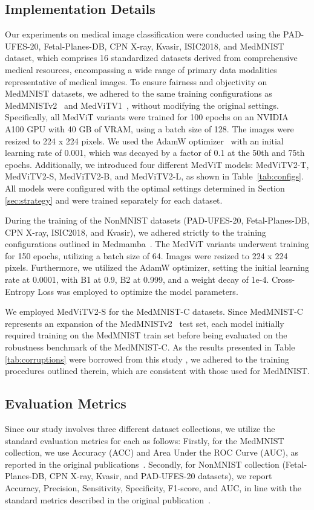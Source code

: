 \documentclass[times,twocolumn,final]{elsarticle}
\begin{document}
\subsection{Implementation Details}
\label{sec:2.5}
Our experiments on medical image classification were conducted using the PAD-UFES-20, Fetal-Planes-DB, CPN X-ray, Kvasir, ISIC2018, and MedMNIST dataset, which comprises 16 standardized datasets derived from comprehensive medical resources, encompassing a wide range of primary data modalities representative of medical images. To ensure fairness and objectivity on MedMNIST datasets, we adhered to the same training configurations as MedMNISTv2~\cite{yang2023medmnist} and MedViTV1~\cite{manzari2023medvit}, without modifying the original settings. Specifically, all MedViT variants were trained for 100 epochs on an NVIDIA A100 GPU with 40 GB of VRAM, using a batch size of 128. The images were resized to 224 x 224 pixels. We used the AdamW optimizer~\cite{AdamW} with an initial learning rate of 0.001, which was decayed by a factor of 0.1 at the 50th and 75th epochs. Additionally, we introduced four different MedViT models: MedViTV2-T, MedViTV2-S, MedViTV2-B, and MedViTV2-L, as shown in Table~\ref{tab:configs}. All models were configured with the optimal settings determined in Section \ref{sec:strategy} and were trained separately for each dataset.

During the training of the NonMNIST datasets (PAD-UFES-20, Fetal-Planes-DB, CPN X-ray, ISIC2018, and Kvasir), we adhered strictly to the training configurations outlined in Medmamba~\cite{yue2024medmamba}. The MedViT variants underwent training for 150 epochs, utilizing a batch size of 64. Images were resized to 224 x 224 pixels. Furthermore, we utilized the AdamW optimizer, setting the initial learning rate at 0.0001, with B1 at 0.9, B2 at 0.999, and a weight decay of 1e-4. Cross-Entropy Loss was employed to optimize the model parameters.

We employed MedViTV2-S for the MedMNIST-C datasets. Since MedMNIST-C represents an expansion of the MedMNISTv2~\cite{yang2023medmnist} test set, each model initially required training on the MedMNIST train set before being evaluated on the robustness benchmark of the MedMNIST-C. As the results presented in Table \ref{tab:corruptions} were borrowed from this study \cite{di2024medmnist}, we adhered to the training procedures outlined therein, which are consistent with those used for MedMNIST.

\subsection{Evaluation Metrics}
Since our study involves three different dataset collections, we utilize the standard evaluation metrics for each as follows:
Firstly, for the MedMNIST collection, we use Accuracy (ACC) and Area Under the ROC Curve (AUC), as reported in the original publications~\cite{yang2023medmnist, yang2021medmnist}.
Secondly, for NonMNIST collection (Fetal-Planes-DB, CPN X-ray, Kvasir, and PAD-UFES-20 datasets), we report Accuracy, Precision, Sensitivity, Specificity, F1-score, and AUC, in line with the standard metrics described in the original publication~\cite{yue2024medmamba}.
\end{document}
